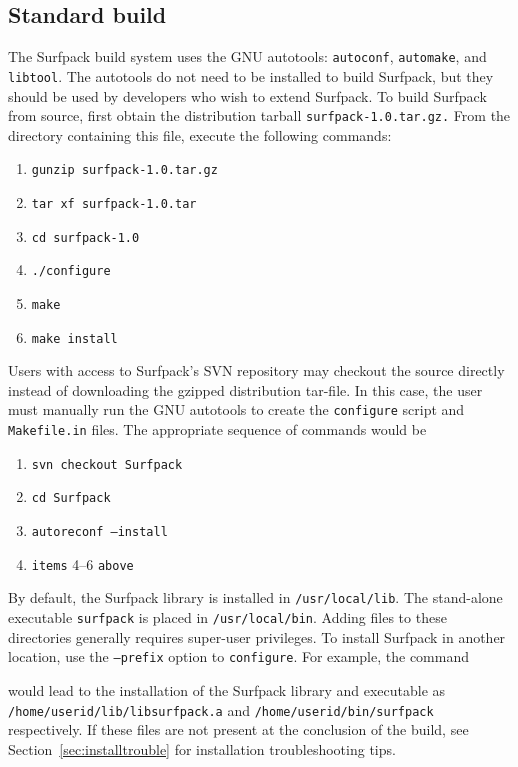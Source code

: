 \documentclass{article}
\begin{document}
\subsection{Standard build}
The Surfpack build system uses the GNU autotools: \texttt{autoconf}, \texttt{automake}, and
\texttt{libtool}.  The autotools do not need to be installed to build Surfpack, but they
should be used by developers who wish to extend Surfpack.  To build Surfpack
from source, first obtain the distribution tarball \texttt{surfpack-1.0.tar.gz.}  From
the directory containing this file, execute the following commands:
\begin{enumerate}
\item \texttt{gunzip surfpack-1.0.tar.gz}
\item \texttt{tar xf surfpack-1.0.tar}
\item \texttt{cd surfpack-1.0}
\item \texttt{./configure}
\item \texttt{make}
\item \texttt{make install}
\end{enumerate}

Users with access to Surfpack's SVN repository may checkout the source directly
instead of downloading the gzipped distribution tar-file.  In this case, the
user must manually run the GNU autotools to create the \texttt{configure} script and
\texttt{Makefile.in} files.  The appropriate sequence of commands would be
\begin{enumerate}
\item \texttt{svn checkout Surfpack}
\item \texttt{cd Surfpack}
\item \texttt{autoreconf --install}
\item \texttt{items} 4--6 \texttt{above}
\end{enumerate}
By default, the Surfpack library is installed in \texttt{/usr/local/lib}.  The stand-alone executable 
\texttt{surfpack} is placed in \texttt{/usr/local/bin}.  Adding files to
these directories generally requires super-user privileges.  To install Surfpack
in another location, use the \texttt{--prefix} option to \texttt{configure}.  For example, the command

would lead to the installation of the Surfpack library and executable as
\texttt{/home/userid/lib/libsurfpack.a} and \texttt{/home/userid/bin/surfpack}
 respectively. If
these files are not present at the conclusion of the build, see Section~\ref{sec:installtrouble} for
installation troubleshooting tips.
\end{document}
